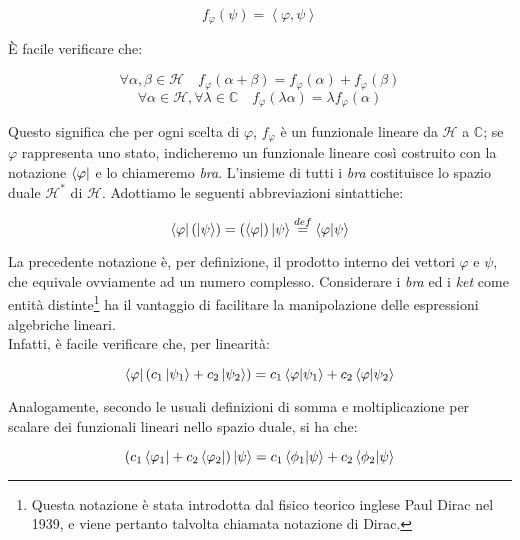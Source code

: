 	\begin{equation}
		f_{\varphi} (\psi) = \left \langle \varphi, \psi \right \rangle
	\end{equation}

È facile verificare che:

	\begin{equation}
		\forall \alpha, \beta \in \mathcal{H} \quad f_{\varphi}(\alpha + \beta) = f_{\varphi}(\alpha) + f_{\varphi}(\beta)
	\end{equation}
	\begin{equation}
		\forall \alpha \in \mathcal{H},  \forall \lambda \in \mathbb{C} \quad f_{\varphi}(\lambda \alpha) = \lambda f_{\varphi}(\alpha)
	\end{equation}

Questo significa che per ogni scelta di $\varphi$, $f_{\varphi}$ è un funzionale lineare da $\mathcal{H}$ a $\mathbb{C}$; se $\varphi$ rappresenta uno stato, indicheremo un funzionale lineare così costruito con la notazione $\bra{\varphi}$ e lo chiameremo \textit{bra}. L'insieme di tutti i \textit{bra} costituisce lo spazio duale $\mathcal{H}^{*}$ di  $\mathcal{H}$. Adottiamo le seguenti abbreviazioni sintattiche:

	\begin{equation}
		\bra{\varphi}(\ket{\psi}) = (\bra{\varphi})\ket{\psi} \overset{def}{=} \braket{\varphi}{\psi}
	\end{equation}

La precedente notazione è, per definizione, il prodotto interno dei vettori $\varphi$ e $\psi$, che equivale ovviamente ad un numero complesso. Considerare i \textit{bra} ed i \textit{ket} come entità distinte\footnote{Questa notazione è stata introdotta dal fisico teorico inglese Paul Dirac nel 1939, e viene pertanto talvolta chiamata notazione di Dirac.} ha il vantaggio di facilitare la manipolazione delle espressioni algebriche lineari. \\
Infatti, è facile verificare che, per linearità:

	\begin{equation} \label{eq:linearityKets}
		\bra{\varphi}(c_1 \ket{\psi_1} + c_2 \ket{\psi_2}) = c_1 \braket{\varphi}{\psi_1} + c_2 \braket{\varphi}{\psi_2}
	\end{equation}

Analogamente, secondo le usuali definizioni di somma e moltiplicazione per scalare dei funzionali lineari nello spazio duale, si ha che:

	\begin{equation}
		(c_1 \bra{\varphi_1} + c_2 \bra{\varphi_2}) \ket{\psi} = c_1 \braket{\phi_1}{\psi} + c_2 \braket{\phi_2}{\psi}
	\end{equation}

